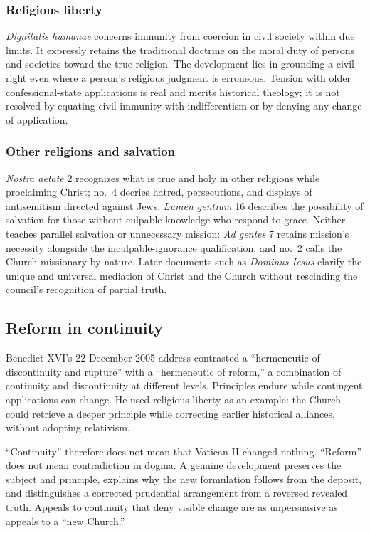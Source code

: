 \subsubsection{Religious liberty}

\emph{Dignitatis humanae} concerns immunity from coercion in civil society within due limits. It expressly retains the traditional doctrine on the moral duty of persons and societies toward the true religion. The development lies in grounding a civil right even where a person's religious judgment is erroneous. Tension with older confessional-state applications is real and merits historical theology; it is not resolved by equating civil immunity with indifferentism or by denying any change of application.

\subsubsection{Other religions and salvation}

\emph{Nostra aetate} 2 recognizes what is true and holy in other religions while proclaiming Christ; no.~4 decries hatred, persecutions, and displays of antisemitism directed against Jews. \emph{Lumen gentium} 16 describes the possibility of salvation for those without culpable knowledge who respond to grace. Neither teaches parallel salvation or unnecessary mission: \emph{Ad gentes} 7 retains mission's necessity alongside the inculpable-ignorance qualification, and no.~2 calls the Church missionary by nature. Later documents such as \emph{Dominus Iesus} clarify the unique and universal mediation of Christ and the Church without rescinding the council's recognition of partial truth.

\subsection{Reform in continuity}

Benedict XVI's 22 December 2005 address contrasted a “hermeneutic of discontinuity and rupture” with a “hermeneutic of reform,” a combination of continuity and discontinuity at different levels. Principles endure while contingent applications can change. He used religious liberty as an example: the Church could retrieve a deeper principle while correcting earlier historical alliances, without adopting relativism.

“Continuity” therefore does not mean that Vatican II changed nothing. “Reform” does not mean contradiction in dogma. A genuine development preserves the subject and principle, explains why the new formulation follows from the deposit, and distinguishes a corrected prudential arrangement from a reversed revealed truth. Appeals to continuity that deny visible change are as unpersuasive as appeals to a “new Church.”

